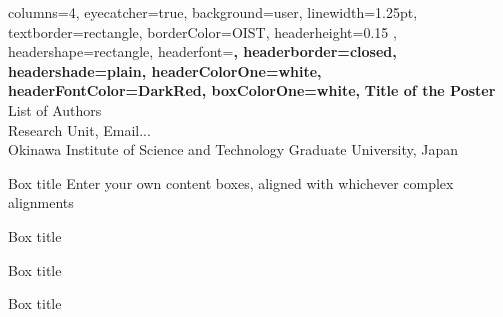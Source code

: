 \documentclass[
    a0paper, %
    portrait, %
    fontscale=0.3 %
    ]{baposter}
\begin{document}
\begin{poster}{ %
    columns=4, %
    eyecatcher=true, %
    background=user, %
    linewidth=1.25pt, %
    textborder=rectangle, %
    borderColor=OIST, %
    headerheight=0.15 \textheight, %
    headershape=rectangle, %
    headerfont=\large \sf \bf, %
    headerborder=closed, %
    headershade=plain, %
    headerColorOne=white, %
    headerFontColor=DarkRed, %
    boxColorOne=white, %
} 
{} %
{\color{OIST}\Huge
 \textbf{Title of the Poster}
}
{ \vspace{1em} 
  List of Authors\\[0.5em]
  \scriptsize
  Research Unit, Email...\\
  Okinawa Institute of Science and Technology Graduate University, Japan
}

\begin{posterbox}[
    name = box1,  %
    column = 0, %
    ]{Box title}
    Enter your own content boxes, aligned with whichever complex alignments
\end{posterbox}


\begin{posterbox}[
    name = box2,  %
    column = 0, %
    below = box1, %
    ]{Box title}
    \lipsum[1]
\end{posterbox}


\begin{posterbox}[
    name = box3,  %
    column = 0, %
    below = box2, %
    ]{Box title}
    \lipsum[1]
\end{posterbox}


\begin{posterbox}[
    name = box4,  %
    column = 1, %
    span = 3, %
    ]{Box title}
    \lipsum[1]
\end{posterbox}



\end{poster}
\end{document}
